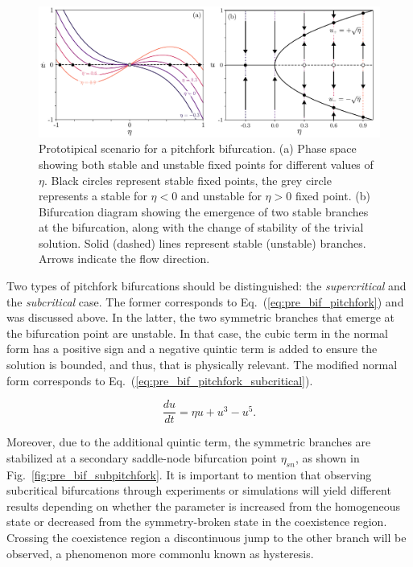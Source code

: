 \begin{figure}[h]
    \centering
    \includegraphics[width=\textwidth]{imagenes/framework/bif_pitch.pdf}
    \caption{Prototipical scenario for a pitchfork bifurcation. (a) Phase space
    showing both stable and unstable fixed points for different values of $\eta$. 
    Black circles represent stable fixed points, the grey circle represents a stable for $\eta < 0$
    and unstable for $\eta > 0$ fixed point. (b) Bifurcation diagram showing
    the emergence of two stable branches at the bifurcation, along with the change of
    stability of the trivial solution. Solid (dashed) lines represent
    stable (unstable) branches. Arrows indicate the flow direction.}
    \label{fig:pre_bif_pitchfork}
\end{figure}

Two types of pitchfork bifurcations should be distinguished: the {\em supercritical} 
and the {\em subcritical} case. The former corresponds to Eq.~(\ref{eq:pre_bif_pitchfork})
and was discussed above. In the latter, the two symmetric branches that emerge at the bifurcation
point are unstable. In that case, the cubic term in the normal form has a positive sign and
a negative quintic term is added to ensure the solution is bounded, and thus, that is physically
relevant. The modified normal form corresponds to Eq.~(\ref{eq:pre_bif_pitchfork_subcritical}).

\begin{equation}
    \dfrac{du}{dt} = \eta u + u ^ 3 - u^5.
    \label{eq:pre_bif_pitchfork_subcritical}
\end{equation}

Moreover, due to the additional quintic term, the symmetric branches are stabilized 
at a secondary saddle-node bifurcation point $\eta_{sn}$, as shown
in Fig.~\ref{fig:pre_bif_subpitchfork}. It is important to mention that observing
subcritical bifurcations through experiments or simulations will yield different
results depending on whether the parameter is increased from the homogeneous state or decreased
from the symmetry-broken state in the coexistence region. Crossing the coexistence region
a discontinuous jump to the other branch will be observed, a phenomenon 
more commonlu known as hysteresis.

